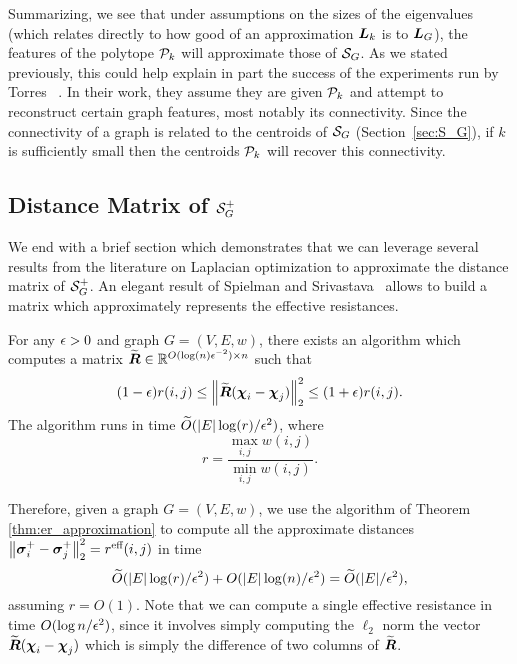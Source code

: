 Summarizing, we see  that under assumptions on the sizes of the eigenvalues (which relates  directly to  how good of an approximation $\L_k$ is to $\L_G$), the features of the  polytope $\P_k$  will  approximate  those of $\splx_G$. As we stated previously, this could help explain in part the success of the experiments run by Torres \etal~\cite{torres2019geometric}.  In their work, they assume they are given  $\P_k$ and  attempt to reconstruct certain  graph  features,  most notably its connectivity.  Since  the connectivity of  a  graph  is related to  the centroids of $\splx_G$ (Section~\ref{sec:S_G}), if $k$ is sufficiently small then  the centroids $\P_k$ will recover this connectivity.  




\subsection{Distance Matrix of \texorpdfstring{$\splx_G^+$}{the inverse combinatorial simplex}}
We end with  a brief section which demonstrates that we can leverage several results from the literature on Laplacian optimization to approximate the  distance matrix  of $\splx_G^+$. 
An elegant result of Spielman and Srivastava~\cite{spielman2011graph} allows to  build a matrix which approximately  represents the effective resistances.  


\begin{theorem}
	\label{thm:er_approximation}
	For any $\eps>0$ and graph $G=(V,E,w)$, there exists an algorithm which computes a matrix $\widetilde{\Reff}\in\R^{O(\log(n)\eps^{-2})\times n}$ such that 
	\begin{equation*}
	(1-\eps)r(i,j) \leq \norm{\widetilde{\Reff}(\bchi_i-\bchi_j)}_2^2 \leq (1+\eps) r(i,j).
	\end{equation*}
	The algorithm runs in time $\widetilde{O}( |E|\log (r)/\eps^2)$, where 
	\[r=\frac{\max_{i,j}w(i,j)}{\min_{i,j}w(i,j)}.\]
\end{theorem}


Therefore, given a graph $G=(V,E,w)$, we use the algorithm of Theorem \ref{thm:er_approximation} to compute all the approximate distances $\norm{\sv_i^+-\sv_j^+}_2^2=\effr(i,j)$ in time \[\widetilde{O}(|E|\log (r)/\eps^2)+O(|E| \log(n)/\eps^2)=\widetilde{O}(|E|/\eps^2),\]
assuming $r=O(1)$. Note that we can compute a single effective resistance in time $O(\log n/\eps^2)$, since it involves simply computing the $\ell_2$ norm the vector $\widetilde{\Reff}(\bchi_i-\bchi_j)$ which is simply the difference of two columns of $\widetilde{\Reff}$. 









